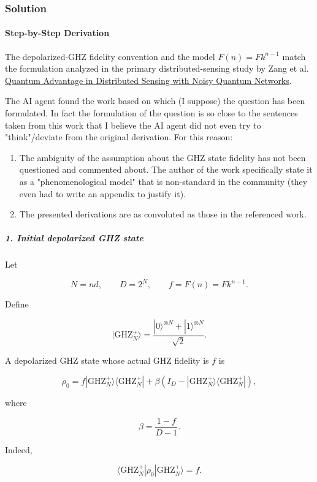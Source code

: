 \subsubsection*{Solution}
\paragraph*{Step-by-Step Derivation}

The depolarized-GHZ fidelity convention and the model $F(n)=Fk^{n-1}$ match the formulation analyzed in the primary distributed-sensing study by Zang et al. \href{\detokenize{https://arxiv.org/abs/2409.17089}}{Quantum Advantage in Distributed Sensing with Noisy Quantum Networks}.

{\color{blue}

The AI agent found the work based on which (I suppose) the question has been formulated. In fact the formulation of the question is so close to the sentences taken from this work that I believe the AI agent did not even try to "think"/deviate from the original derivation. For this reason:
\begin{enumerate}
  \item The ambiguity of the assumption about the GHZ state fidelity has not been questioned and commented about. The author of the work specifically state it as a "phenomenological model" that is non-standard in the community (they even had to write an appendix to justify it).
  \item The presented derivations are as convoluted as those in the referenced work.
\end{enumerate}

}

\subparagraph*{1. Initial depolarized GHZ state}

Let

\[
N=nd,\qquad D=2^N,\qquad f=F(n)=Fk^{n-1}.
\]

Define

\[
|\mathrm{GHZ}_N^{+}\rangle = \frac{|0\rangle^{\otimes N}+|1\rangle^{\otimes N}}{\sqrt2}.
\]

A depolarized GHZ state whose actual GHZ fidelity is $f$ is

\[
\rho_0 = f|\mathrm{GHZ}_N^{+}\rangle\langle\mathrm{GHZ}_N^{+}| + \beta\left( I_D- |\mathrm{GHZ}_N^{+}\rangle\langle\mathrm{GHZ}_N^{+}| \right),
\]

where

\[
\beta=\frac{1-f}{D-1}.
\]

Indeed,

\[
\langle\mathrm{GHZ}_N^{+}|\rho_0|\mathrm{GHZ}_N^{+}\rangle=f.
\]

